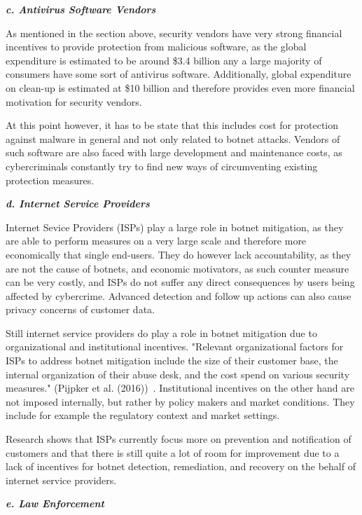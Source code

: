 \textbf{\textit{c. Antivirus Software Vendors}}

As mentioned in the section above, security vendors have very strong financial incentives to provide protection from malicious software, as the global expenditure is estimated to be around \$3.4 billion any a large majority of consumers have some sort of antivirus software.
Additionally, global expenditure on clean-up is estimated at \$10 billion and therefore provides even more financial motivation for security vendors.\cite{Anderson13}

At this point however, it has to be state that this includes cost for protection against malware in general and not only related to botnet attacks.
Vendors of such software are also faced with large development and maintenance costs, as cybercriminals constantly try to find new ways of circumventing existing protection measures.

\textbf{\textit{d. Internet Service Providers}}

Internet Sevice Providers (ISPs) play a large role in botnet mitigation, as they are able to perform measures on a very large scale and therefore more economically that single end-users.
They do however lack accountability, as they are not the cause of botnets, and economic motivators, as such counter measure can be very costly, and ISPs do not suffer any direct consequences by users being affected by cybercrime.
Advanced detection and follow up actions can also cause privacy concerns of customer data.\cite{Pijpker16}

Still internet service providers do play a role in botnet mitigation due to organizational and institutional incentives.
"Relevant organizational factors for ISPs to address botnet mitigation include the size of their customer base, the internal organization of their abuse desk, and the cost spend on various security measures." (Pijpker et al. (2016))~\cite{Pijpker16}.
Institutional incentives on the other hand are not imposed internally, but rather by policy makers and market conditions.
They include for example the regulatory context and market settings.\cite{Pijpker16}

Research shows that ISPs currently focus more on prevention and notification of customers and that there is still quite a lot of room for improvement due to a lack of incentives for botnet detection, remediation, and recovery on the behalf of internet service providers.\cite{Pijpker16}

\textbf{\textit{e. Law Enforcement}}

